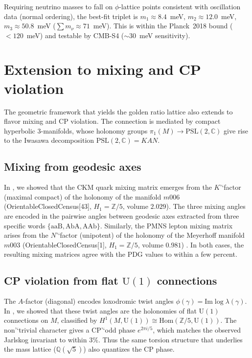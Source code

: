 \documentclass[12pt]{article}
\theoremstyle{definition}
\begin{document}
Requiring neutrino masses to fall on $\phi$-lattice points consistent
with oscillation data (normal ordering), the best-fit triplet is
$m_1\approx8.4$~meV, $m_2\approx12.0$~meV, $m_3\approx50.8$~meV
($\sum m_\nu\approx71$~meV). This is within the Planck~2018 bound
($<120$~meV) and testable by CMB-S4 ($\sim30$~meV sensitivity).

\section{Extension to mixing and CP violation}




\label{sec:mixing_cp}

The geometric framework that yields the golden ratio lattice also extends to flavor mixing and CP violation. The connection is mediated by compact hyperbolic 3-manifolds, whose holonomy groups $\pi_1(M)\to\mathrm{PSL}(2,\mathbb{C})$ give rise to the Iwasawa decomposition $\mathrm{PSL}(2,\mathbb{C}) = KAN$.

\subsection{Mixing from geodesic axes}
In \cite{Gentry:CKM}, we showed that the CKM quark mixing matrix emerges from the $K$'`factor (maximal compact) of the holonomy of the manifold $m006$ (OrientableClosedCensus[43], $H_1=\mathbb{Z}/5$, volume $2.029$). The three mixing angles are encoded in the pairwise angles between geodesic axes extracted from three specific words $\{\mathrm{aaB},\mathrm{AbA},\mathrm{AAb}\}$. Similarly, the PMNS lepton mixing matrix arises from the $N$'`factor (unipotent) of the holonomy of the Meyerhoff manifold $m003$ (OrientableClosedCensus[1], $H_1=\mathbb{Z}/5$, volume $0.981$) \cite{Gentry:PMNS}. In both cases, the resulting mixing matrices agree with the PDG values to within a few percent.

\subsection{CP violation from flat $\mathrm{U}(1)$ connections}
The $A$-factor (diagonal) encodes loxodromic twist angles $\phi(\gamma)=\mathrm{Im}\log\lambda(\gamma)$. In \cite{Gentry:CP}, we showed that these twist angles are the holonomies of flat $\mathrm{U}(1)$ connections on $M$, classified by $H^1(M,\mathrm{U}(1))\cong\mathrm{Hom}(\mathbb{Z}/5,\mathrm{U}(1))$. The non'`trivial character gives a CP'`odd phase $e^{2\pi i/5}$, which matches the observed Jarlskog invariant to within $3\%$. Thus the same torsion structure that underlies the mass lattice ($\mathbb{Q}(\sqrt5)$) also quantizes the CP phase.
\end{document}
